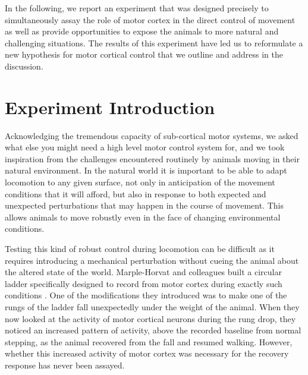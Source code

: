 In the following, we report an experiment that was designed precisely to simultaneously assay the role of motor cortex in the direct control of movement as well as provide opportunities to expose the animals to more natural and challenging situations. The results of this experiment have led us to reformulate a new hypothesis for motor cortical control that we outline and address in the discussion.

\section{Experiment Introduction}

Acknowledging the tremendous capacity of sub-cortical motor systems, we asked what else you might need a high level motor control system for, and we took inspiration from the challenges encountered routinely by animals moving in their natural environment. In the natural world it is important to be able to adapt locomotion to any given surface, not only in anticipation of the movement conditions that it will afford, but also in response to both expected and unexpected perturbations that may happen in the course of movement. This allows animals to move robustly even in the face of changing environmental conditions.

Testing this kind of robust control during locomotion can be difficult as it requires introducing a mechanical perturbation without cueing the animal about the altered state of the world. Marple-Horvat and colleagues built a circular ladder specifically designed to record from motor cortex during exactly such conditions \cite{Marple-Horvat1993}. One of the modifications they introduced was to make one of the rungs of the ladder fall unexpectedly under the weight of the animal. When they now looked at the activity of motor cortical neurons during the rung drop, they noticed an increased pattern of activity, above the recorded baseline from normal stepping, as the animal recovered from the fall and resumed walking. However, whether this increased activity of motor cortex was necessary for the recovery response has never been assayed.

